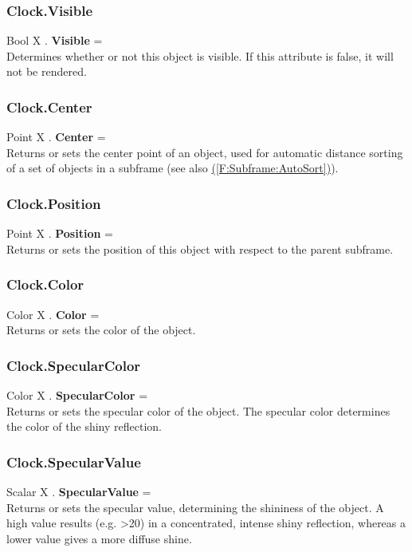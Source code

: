 \documentclass[10pt]{book}
\newcommand{\linkitem}[1]{\hyperref[#1]{\nameref{#1} (\ref{#1})}}
\begin{document}
\subsubsection{Clock.Visible \label{F:Clock:Visible}}
Bool X . \textbf{Visible} = \\
Determines whether or not this object is visible. If this attribute is false, it will not be rendered.

\subsubsection{Clock.Center \label{F:Clock:Center}}
Point X . \textbf{Center} = \\
Returns or sets the center point of an object, used for automatic distance sorting of a set of objects in a subframe (see also \linkitem{F:Subframe:AutoSort}).

\subsubsection{Clock.Position \label{F:Clock:Position}}
Point X . \textbf{Position} = \\
Returns or sets the position of this object with respect to the parent subframe.

\subsubsection{Clock.Color \label{F:Clock:Color}}
Color X . \textbf{Color} = \\
Returns or sets the color of the object.

\subsubsection{Clock.SpecularColor \label{F:Clock:SpecularColor}}
Color X . \textbf{SpecularColor} = \\
Returns or sets the specular color of the object. The specular color determines the color of the shiny reflection.

\subsubsection{Clock.SpecularValue \label{F:Clock:SpecularValue}}
Scalar X . \textbf{SpecularValue} = \\
Returns or sets the specular value, determining the shininess of the object. A high value results (e.g. >20) in a concentrated, intense shiny reflection, whereas a lower value gives a more diffuse shine.
\end{document}
